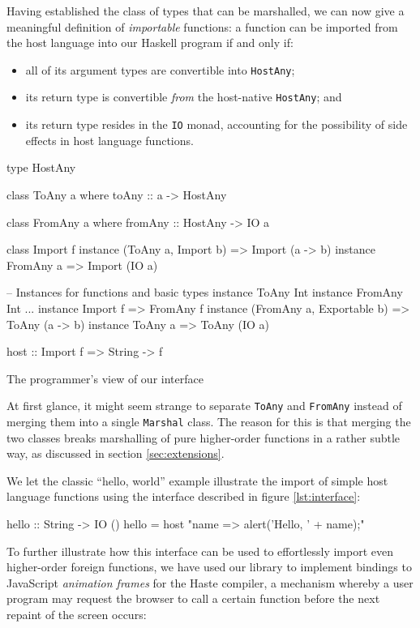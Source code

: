 \documentclass{sigplanconf}
\begin{document}
Having established the class of types that can be marshalled, we can now give
a meaningful definition of \emph{importable} functions: a function can be
imported from the host language into our Haskell program if and only if:
\begin{itemize}
\item
  all of its argument types are convertible into \lstinline!HostAny!;
\item
  its return type is convertible \emph{from} the host-native
  \lstinline!HostAny!; and
\item
  its return type resides in the \lstinline!IO! monad, accounting for the
  possibility of side effects in host language functions.
\end{itemize}

\begin{listingfloat}
\begin{code}
type HostAny

class ToAny a where
  toAny :: a -> HostAny

class FromAny a where
  fromAny :: HostAny -> IO a

class Import f
instance (ToAny a, Import b) => Import (a -> b)
instance FromAny a           => Import (IO a)

-- Instances for functions and basic types
instance ToAny Int
instance FromAny Int
...
instance Import f => FromAny f
instance (FromAny a, Exportable b) => ToAny (a -> b)
instance ToAny a => ToAny (IO a)

host :: Import f => String -> f
\end{code}
\caption{The programmer's view of our interface}
\label{lst:interface}
\end{listingfloat}

At first glance, it might seem strange to separate \lstinline!ToAny!
and \lstinline!FromAny! instead of merging them into a single
\lstinline!Marshal! class. The reason for this is that merging the two classes
breaks marshalling of pure higher-order functions in a rather subtle way, as
discussed in section \ref{sec:extensions}.

We let the classic ``hello, world'' example illustrate the import of simple
host language functions using the interface described in figure
\ref{lst:interface}:

\begin{code}
hello :: String -> IO ()
hello = host "name => alert('Hello, ' + name);"
\end{code}

To further illustrate how this interface can be used to effortlessly import
even higher-order foreign functions, we have used our library to
implement bindings to JavaScript \emph{animation frames} for the Haste
compiler, a mechanism whereby a user program may request the browser to call
a certain function before the next repaint of the screen occurs:
\end{document}

